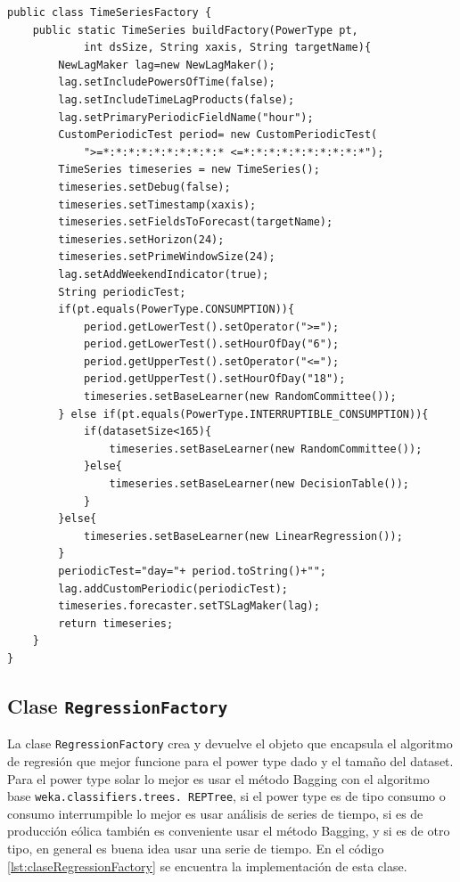 \begin{lstlisting}[frame=single]  
public class TimeSeriesFactory {
	public static TimeSeries buildFactory(PowerType pt, 
			int dsSize, String xaxis, String targetName){
		NewLagMaker lag=new NewLagMaker();
		lag.setIncludePowersOfTime(false);
		lag.setIncludeTimeLagProducts(false);
		lag.setPrimaryPeriodicFieldName("hour"); 
		CustomPeriodicTest period= new CustomPeriodicTest(
			">=*:*:*:*:*:*:*:*:*:* <=*:*:*:*:*:*:*:*:*:*");
		TimeSeries timeseries = new TimeSeries();
		timeseries.setDebug(false);
		timeseries.setTimestamp(xaxis);
		timeseries.setFieldsToForecast(targetName);
        timeseries.setHorizon(24);
        timeseries.setPrimeWindowSize(24);
        lag.setAddWeekendIndicator(true);
        String periodicTest;
		if(pt.equals(PowerType.CONSUMPTION)){
			period.getLowerTest().setOperator(">=");
			period.getLowerTest().setHourOfDay("6");
			period.getUpperTest().setOperator("<=");
			period.getUpperTest().setHourOfDay("18");
	        timeseries.setBaseLearner(new RandomCommittee());
		} else if(pt.equals(PowerType.INTERRUPTIBLE_CONSUMPTION)){
			if(datasetSize<165){
				timeseries.setBaseLearner(new RandomCommittee());
			}else{
				timeseries.setBaseLearner(new DecisionTable());
			}
		}else{
			timeseries.setBaseLearner(new LinearRegression());
		}
		periodicTest="day="+ period.toString()+"";
		lag.addCustomPeriodic(periodicTest);
		timeseries.forecaster.setTSLagMaker(lag);
		return timeseries;
	}
}

\end{lstlisting}

\clearpage 
\subsection{Clase \texttt{RegressionFactory}} \label{subsec:claseRegressionFactory}
La clase \texttt{RegressionFactory} crea y devuelve el objeto que encapsula el algoritmo de regresión que mejor funcione para el power type dado y el tamaño del dataset. Para el power type solar lo mejor es usar el método Bagging con el algoritmo base \texttt{weka.classifiers.trees. REPTree}, si el power type es de tipo consumo o consumo interrumpible lo mejor es usar análisis de series de tiempo, si es de producción eólica también es conveniente usar el método Bagging, y si es de otro tipo, en general es buena idea usar una serie de tiempo.
En el código \ref{lst:claseRegressionFactory} se encuentra la implementación de esta clase.


